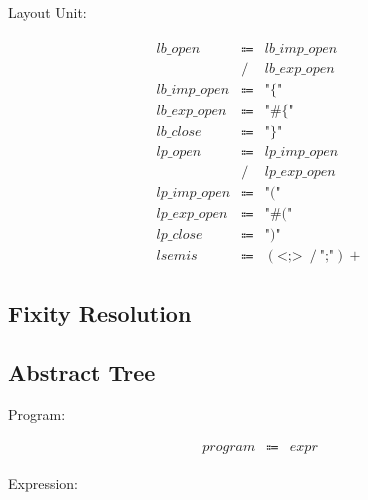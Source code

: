 Layout Unit:

\begin{align*}
    \begin{array}{rcll}
        \mathit{lb\_open}
        &\Coloneq &\mathit{lb\_imp\_open} \\
        &\mathrel{/} &\mathit{lb\_exp\_open} \\
        \mathit{lb\_imp\_open}
        &\Coloneq &\texttt{"\{"} \\
        \mathit{lb\_exp\_open}
        &\Coloneq &\texttt{"\#\{"} \\
        \mathit{lb\_close}
        &\Coloneq &\texttt{"\}"} \\
        \mathit{lp\_open}
        &\Coloneq &\mathit{lp\_imp\_open} \\
        &\mathrel{/} &\mathit{lp\_exp\_open} \\
        \mathit{lp\_imp\_open}
        &\Coloneq &\texttt{"("} \\
        \mathit{lp\_exp\_open}
        &\Coloneq &\texttt{"\#("} \\
        \mathit{lp\_close}
        &\Coloneq &\texttt{")"} \\
        \mathit{lsemis}
        &\Coloneq &(\texttt{<;>}\; \mathrel{/} \texttt{";"}){+}
    \end{array}
\end{align*}

\subsection{Fixity Resolution}

\subsection{Abstract Tree}

Program:

\begin{align*}
    \begin{array}{rcll}
        \mathit{program}
        &\Coloneq &\mathit{expr}
    \end{array}
\end{align*}

Expression:

